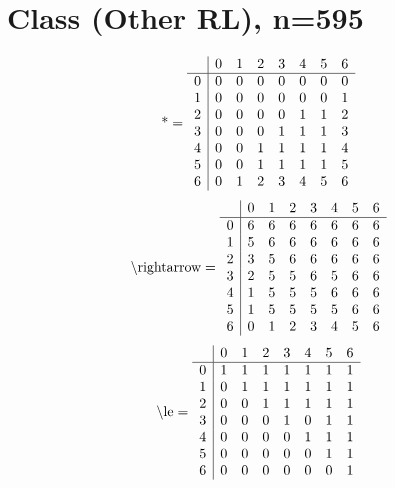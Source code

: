 \documentclass[11pt]{article}
\begin{document}
\section{Class (Other RL), n=595}
\[\text{*} = 
\begin{array}{r | r r r r r r r}
 & 0 & 1 & 2 & 3 & 4 & 5 & 6 \\ \hline
0 & 0 & 0 & 0 & 0 & 0 & 0 & 0 \\
1 & 0 & 0 & 0 & 0 & 0 & 0 & 1 \\
2 & 0 & 0 & 0 & 0 & 1 & 1 & 2 \\
3 & 0 & 0 & 0 & 1 & 1 & 1 & 3 \\
4 & 0 & 0 & 1 & 1 & 1 & 1 & 4 \\
5 & 0 & 0 & 1 & 1 & 1 & 1 & 5 \\
6 & 0 & 1 & 2 & 3 & 4 & 5 & 6 \\
\end{array}
\]
\[\text{\textbackslash rightarrow} = 
\begin{array}{r | r r r r r r r}
 & 0 & 1 & 2 & 3 & 4 & 5 & 6 \\ \hline
0 & 6 & 6 & 6 & 6 & 6 & 6 & 6 \\
1 & 5 & 6 & 6 & 6 & 6 & 6 & 6 \\
2 & 3 & 5 & 6 & 6 & 6 & 6 & 6 \\
3 & 2 & 5 & 5 & 6 & 5 & 6 & 6 \\
4 & 1 & 5 & 5 & 5 & 6 & 6 & 6 \\
5 & 1 & 5 & 5 & 5 & 5 & 6 & 6 \\
6 & 0 & 1 & 2 & 3 & 4 & 5 & 6 \\
\end{array}
\]
\[\text{\textbackslash le} = 
\begin{array}{r | r r r r r r r}
 & 0 & 1 & 2 & 3 & 4 & 5 & 6 \\ \hline
0 & 1 & 1 & 1 & 1 & 1 & 1 & 1 \\
1 & 0 & 1 & 1 & 1 & 1 & 1 & 1 \\
2 & 0 & 0 & 1 & 1 & 1 & 1 & 1 \\
3 & 0 & 0 & 0 & 1 & 0 & 1 & 1 \\
4 & 0 & 0 & 0 & 0 & 1 & 1 & 1 \\
5 & 0 & 0 & 0 & 0 & 0 & 1 & 1 \\
6 & 0 & 0 & 0 & 0 & 0 & 0 & 1 \\
\end{array}
\]
\end{document}
